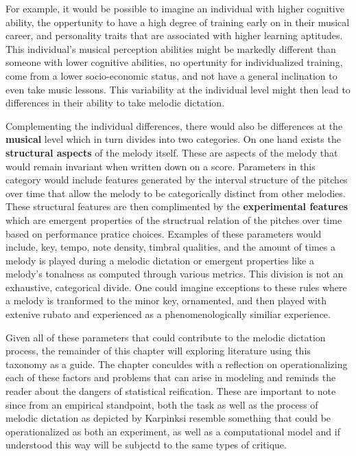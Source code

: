 \documentclass[]{book}
\theoremstyle{definition}
\theoremstyle{definition}
\theoremstyle{definition}
\theoremstyle{remark}
\begin{document}
For example, it would be possible to imagine an individual with higher
cognitive ability, the oppertunity to have a high degree of training
early on in their musical career, and personality traits that are
associated with higher learning aptitudes. This individual's musical
perception abilities might be markedly different than someone with lower
cognitive abilities, no opertunity for individualized training, come
from a lower socio-economic status, and not have a general inclination
to even take music lessons. This variability at the individual level
might then lead to differences in their ability to take melodic
dictation.

Complementing the individual differences, there would also be
differences at the \textbf{musical} level which in turn divides into two
categories. On one hand exists the \textbf{structural aspects} of the
melody itself. These are aspects of the melody that would remain
invariant when written down on a score. Parameters in this category
would include features generated by the interval structure of the
pitches over time that allow the melody to be categorically distinct
from other melodies. These structural features are then complimented by
the \textbf{experimental features} which are emergent properties of the
structrual relation of the pitches over time based on performance
pratice choices. Examples of these parameters would include, key, tempo,
note density, timbral qualities, and the amount of times a melody is
played during a melodic dictation or emergent properties like a melody's
tonalness as computed through various metrics. This division is not an
exhaustive, categorical divide. One could imagine exceptions to these
rules where a melody is tranformed to the minor key, ornamented, and
then played with extenive rubato and experienced as a phenomenologically
similiar experience.

Given all of these parameters that could contribute to the melodic
dictation process, the remainder of this chapter will exploring
literature using this taxonomy as a guide. The chapter conculdes with a
reflection on operationalizing each of these factors and problems that
can arise in modeling and reminds the reader about the dangers of
statistical reification. These are important to note since from an
empirical standpoint, both the task as well as the process of melodic
dictation as depicted by Karpinksi resemble something that could be
operationalized as both an experiment, as well as a computational model
and if understood this way will be subjectd to the same types of
critique.
\end{document}
